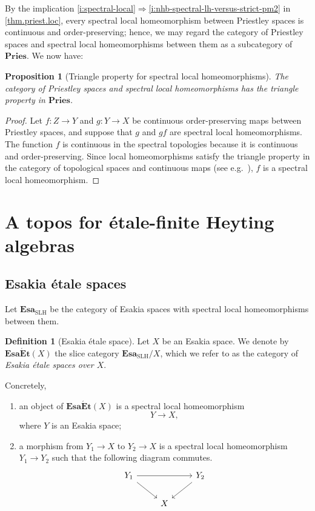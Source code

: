 \documentclass[12pt]{amsart}
\theoremstyle{plain}
\newtheorem{proposition}[theorem]{Proposition}
\theoremstyle{definition}
\newtheorem{definition}[theorem]{Definition}
\newcommand{\cat}[1]{\mathbf{#1}}
\newcommand{\Esa}{\cat{Esa}}
\newcommand{\Pries}{\cat{Pries}}
\newcommand{\SLH}{\mathrm{SLH}}
\newcommand{\EsaEt}{\cat{Esa\acute{E}t}}
\begin{document}
By the implication \eqref{i:spectral-local}$\Rightarrow$\eqref{i:nhb-spectral-lh-versus-strict-pm2} in \cref{thm.priest.loc}, every spectral local homeomorphism between Priestley spaces is continuous and order-preserving; hence, we may regard the category of Priestley spaces and spectral local homeomorphisms between them as a subcategory of $\Pries$. We now have:

\begin{proposition}[Triangle property for spectral local homeomorphisms] \label{prop: Triangle property for spectral local homeomorphisms}
    The category of Priestley spaces and spectral local homeomorphisms has the triangle property in $\Pries$.
\end{proposition}
\begin{proof}
    Let $f \colon Z \to Y$ and $g \colon Y \to X$ be continuous order-preserving maps between Priestley spaces, and suppose that $g$ and $gf$ are spectral local homeomorphisms.
    The function $f$ is continuous in the spectral topologies because it is continuous and order-preserving.
    Since local homeomorphisms satisfy the triangle property in the category of topological spaces and continuous maps (see e.g.\ \cite[Lem.~6.4.5]{janelidzeborceaux}), $f$ is a spectral local homeomorphism.
\end{proof}


\section{A topos for étale-finite Heyting algebras} \label{sec:topos}



\subsection{Esakia étale spaces}


Let $\Esa_{\SLH}$ be the category of Esakia spaces with spectral local homeomorphisms between them. 

\begin{definition}[Esakia étale space]
    Let $X$ be an Esakia space. We denote by $\EsaEt(X)$ the slice category $\Esa_{\SLH}/X$, which we refer to as the category of \emph{Esakia étale spaces over $X$}.
\end{definition}

Concretely, 
\begin{enumerate}
    \item an object of $\EsaEt(X)$ is a spectral local homeomorphism
    \[
    Y \longrightarrow X,
    \]
    where $Y$ is an Esakia space;

    \item a morphism from $Y_1 \to X$ to $Y_2 \to X$ is a spectral local homeomorphism $Y_1 \to Y_2$ such that the following diagram commutes.
    \[
    \begin{tikzcd}
        Y_1 \arrow{rr} \arrow{rd}& & Y_2 \arrow{ld}\\
        & X
    \end{tikzcd}
    \]
\end{enumerate}
\end{document}
